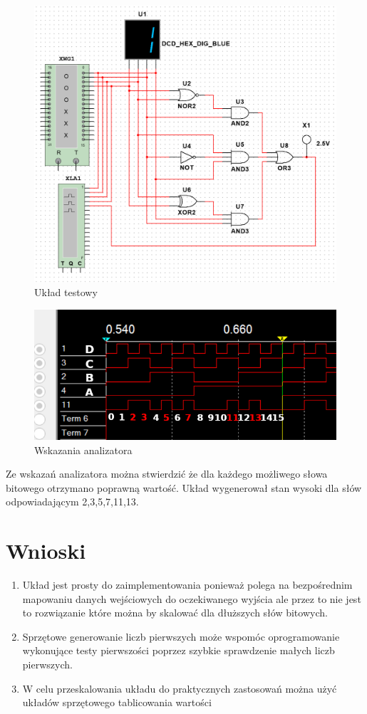 \documentclass[12pt,a4paper,openright]{mwrep}
\begin{document}
\begin{figure}[H]
    \centering
    \includegraphics[width=1\textwidth]{images/1b_schema_2.PNG}
    \caption{Układ testowy}
    \label{rys:1b_test_circuit}
\end{figure}
\begin{figure}[H]
    \centering
    \includegraphics[width=1\textwidth]{images/1b_result.PNG}
    \caption{Wskazania analizatora}
    \label{rys:1b_test_results}
\end{figure}
Ze wskazań analizatora można stwierdzić że dla każdego możliwego słowa bitowego otrzymano poprawną wartość.
Układ wygenerował stan wysoki dla słów odpowiadającym 2,3,5,7,11,13.
\section{Wnioski}
\begin{enumerate}
    \item Układ jest prosty do zaimplementowania ponieważ polega na bezpośrednim mapowaniu danych wejściowych do oczekiwanego
    wyjścia ale przez to nie jest to rozwiązanie które można by skalować dla dłuższych słów bitowych.
    \item Sprzętowe generowanie liczb pierwszych może wspomóc oprogramowanie wykonujące testy pierwszości
    poprzez szybkie sprawdzenie małych liczb pierwszych.
    \item W celu przeskalowania układu do praktycznych zastosowań można użyć układów sprzętowego tablicowania wartości 
\end{enumerate}
\end{document}
